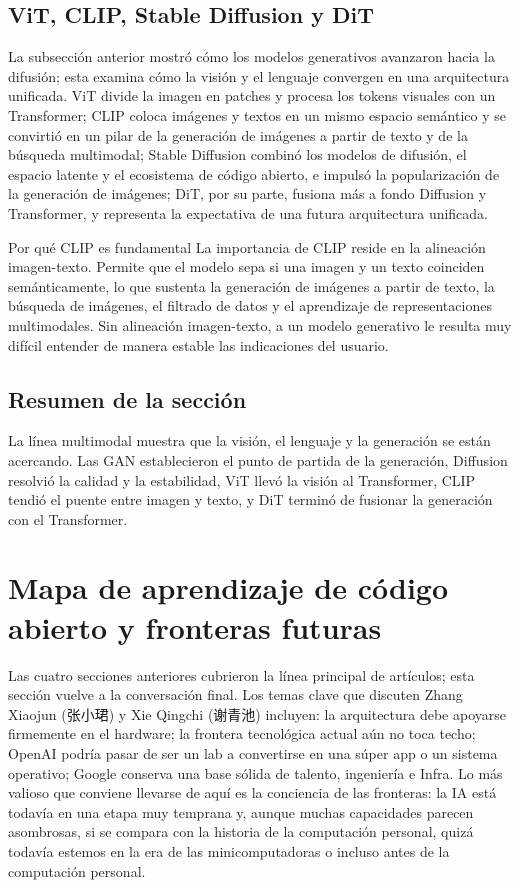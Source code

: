 \documentclass[a4paper]{article}
\begin{document}
\subsection{ViT, CLIP, Stable Diffusion y DiT}

La subsección anterior mostró cómo los modelos generativos avanzaron hacia la difusión; esta examina cómo la visión y el lenguaje convergen en una arquitectura unificada. ViT divide la imagen en patches y procesa los tokens visuales con un Transformer; CLIP coloca imágenes y textos en un mismo espacio semántico y se convirtió en un pilar de la generación de imágenes a partir de texto y de la búsqueda multimodal; Stable Diffusion combinó los modelos de difusión, el espacio latente y el ecosistema de código abierto, e impulsó la popularización de la generación de imágenes; DiT, por su parte, fusiona más a fondo Diffusion y Transformer, y representa la expectativa de una futura arquitectura unificada.

\begin{importantbox}{Por qué CLIP es fundamental}
La importancia de CLIP reside en la alineación imagen-texto. Permite que el modelo sepa si una imagen y un texto coinciden semánticamente, lo que sustenta la generación de imágenes a partir de texto, la búsqueda de imágenes, el filtrado de datos y el aprendizaje de representaciones multimodales. Sin alineación imagen-texto, a un modelo generativo le resulta muy difícil entender de manera estable las indicaciones del usuario.
\end{importantbox}

\subsection{Resumen de la sección}

La línea multimodal muestra que la visión, el lenguaje y la generación se están acercando. Las GAN establecieron el punto de partida de la generación, Diffusion resolvió la calidad y la estabilidad, ViT llevó la visión al Transformer, CLIP tendió el puente entre imagen y texto, y DiT terminó de fusionar la generación con el Transformer.

\section{Mapa de aprendizaje de código abierto y fronteras futuras}

Las cuatro secciones anteriores cubrieron la línea principal de artículos; esta sección vuelve a la conversación final. Los temas clave que discuten Zhang Xiaojun (张小珺) y Xie Qingchi (谢青池) incluyen: la arquitectura debe apoyarse firmemente en el hardware; la frontera tecnológica actual aún no toca techo; OpenAI podría pasar de ser un lab a convertirse en una súper app o un sistema operativo; Google conserva una base sólida de talento, ingeniería e Infra. Lo más valioso que conviene llevarse de aquí es la conciencia de las fronteras: la IA está todavía en una etapa muy temprana y, aunque muchas capacidades parecen asombrosas, si se compara con la historia de la computación personal, quizá todavía estemos en la era de las minicomputadoras o incluso antes de la computación personal.
\end{document}
